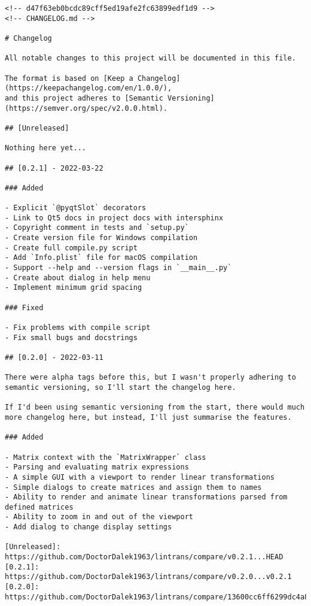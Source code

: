\documentclass[../development.tex]{subfiles}
\begin{document}
{
\renewcommand\theFancyVerbLine{ \ttfamily
	\textcolor[rgb]{0.5,0.5,1}{
		\footnotesize
		\oldstylenums{
			\ifnum\value{FancyVerbLine}=-3 \else
			\ifnum\value{FancyVerbLine}=-2 \else
			\ifnum\value{FancyVerbLine}=-1\setcounter{FancyVerbLine}{0}\else
				\arabic{FancyVerbLine}
			\fi\fi\fi
		}
	}
}
\begin{verbatim}
<!-- d47f63eb0bcdc89cff5ed19afe2fc63899edf1d9 -->
<!-- CHANGELOG.md -->

# Changelog

All notable changes to this project will be documented in this file.

The format is based on [Keep a Changelog](https://keepachangelog.com/en/1.0.0/),
and this project adheres to [Semantic Versioning](https://semver.org/spec/v2.0.0.html).

## [Unreleased]

Nothing here yet...

## [0.2.1] - 2022-03-22

### Added

- Explicit `@pyqtSlot` decorators
- Link to Qt5 docs in project docs with intersphinx
- Copyright comment in tests and `setup.py`
- Create version file for Windows compilation
- Create full compile.py script
- Add `Info.plist` file for macOS compilation
- Support --help and --version flags in `__main__.py`
- Create about dialog in help menu
- Implement minimum grid spacing

### Fixed

- Fix problems with compile script
- Fix small bugs and docstrings

## [0.2.0] - 2022-03-11

There were alpha tags before this, but I wasn't properly adhering to semantic versioning, so I'll start the changelog here.

If I'd been using semantic versioning from the start, there would much more changelog here, but instead, I'll just summarise the features.

### Added

- Matrix context with the `MatrixWrapper` class
- Parsing and evaluating matrix expressions
- A simple GUI with a viewport to render linear transformations
- Simple dialogs to create matrices and assign them to names
- Ability to render and animate linear transformations parsed from defined matrices
- Ability to zoom in and out of the viewport
- Add dialog to change display settings

[Unreleased]: https://github.com/DoctorDalek1963/lintrans/compare/v0.2.1...HEAD
[0.2.1]: https://github.com/DoctorDalek1963/lintrans/compare/v0.2.0...v0.2.1
[0.2.0]: https://github.com/DoctorDalek1963/lintrans/compare/13600cc6ff6299dc4a8101a367bc52fe08607554...v0.2.0
\end{verbatim}
}
\end{document}
